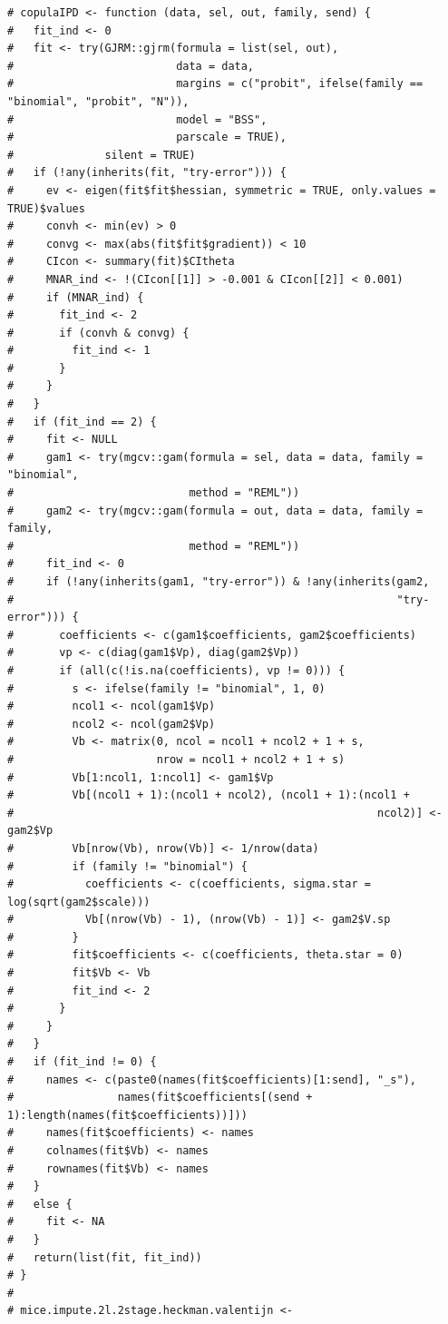 \documentclass[
  article]{jss}
\begin{document}
\begin{verbatim}
# copulaIPD <- function (data, sel, out, family, send) {
#   fit_ind <- 0
#   fit <- try(GJRM::gjrm(formula = list(sel, out), 
#                         data = data, 
#                         margins = c("probit", ifelse(family == "binomial", "probit", "N")), 
#                         model = "BSS", 
#                         parscale = TRUE), 
#              silent = TRUE)
#   if (!any(inherits(fit, "try-error"))) {
#     ev <- eigen(fit$fit$hessian, symmetric = TRUE, only.values = TRUE)$values
#     convh <- min(ev) > 0
#     convg <- max(abs(fit$fit$gradient)) < 10
#     CIcon <- summary(fit)$CItheta
#     MNAR_ind <- !(CIcon[[1]] > -0.001 & CIcon[[2]] < 0.001)
#     if (MNAR_ind) {
#       fit_ind <- 2
#       if (convh & convg) {
#         fit_ind <- 1
#       }
#     }
#   }
#   if (fit_ind == 2) {
#     fit <- NULL
#     gam1 <- try(mgcv::gam(formula = sel, data = data, family = "binomial", 
#                           method = "REML"))
#     gam2 <- try(mgcv::gam(formula = out, data = data, family = family, 
#                           method = "REML"))
#     fit_ind <- 0
#     if (!any(inherits(gam1, "try-error")) & !any(inherits(gam2, 
#                                                           "try-error"))) {
#       coefficients <- c(gam1$coefficients, gam2$coefficients)
#       vp <- c(diag(gam1$Vp), diag(gam2$Vp))
#       if (all(c(!is.na(coefficients), vp != 0))) {
#         s <- ifelse(family != "binomial", 1, 0)
#         ncol1 <- ncol(gam1$Vp)
#         ncol2 <- ncol(gam2$Vp)
#         Vb <- matrix(0, ncol = ncol1 + ncol2 + 1 + s, 
#                      nrow = ncol1 + ncol2 + 1 + s)
#         Vb[1:ncol1, 1:ncol1] <- gam1$Vp
#         Vb[(ncol1 + 1):(ncol1 + ncol2), (ncol1 + 1):(ncol1 + 
#                                                        ncol2)] <- gam2$Vp
#         Vb[nrow(Vb), nrow(Vb)] <- 1/nrow(data)
#         if (family != "binomial") {
#           coefficients <- c(coefficients, sigma.star = log(sqrt(gam2$scale)))
#           Vb[(nrow(Vb) - 1), (nrow(Vb) - 1)] <- gam2$V.sp
#         }
#         fit$coefficients <- c(coefficients, theta.star = 0)
#         fit$Vb <- Vb
#         fit_ind <- 2
#       }
#     }
#   }
#   if (fit_ind != 0) {
#     names <- c(paste0(names(fit$coefficients)[1:send], "_s"), 
#                names(fit$coefficients[(send + 1):length(names(fit$coefficients))]))
#     names(fit$coefficients) <- names
#     colnames(fit$Vb) <- names
#     rownames(fit$Vb) <- names
#   }
#   else {
#     fit <- NA
#   }
#   return(list(fit, fit_ind))
# }
# 
# mice.impute.2l.2stage.heckman.valentijn <- 

\end{verbatim}
\end{document}

